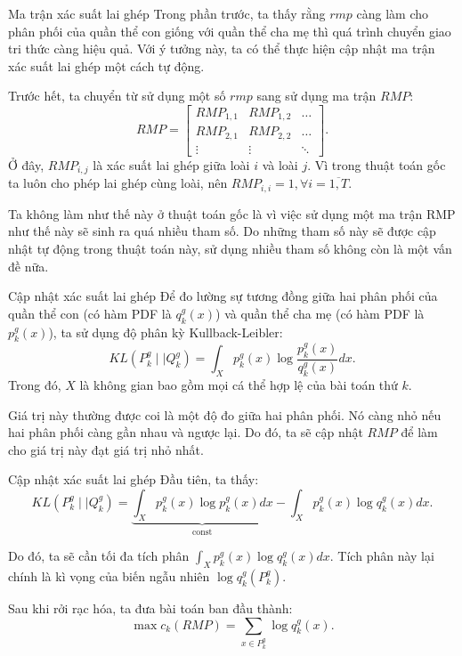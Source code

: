 \begin{frame}{Ma trận xác suất lai ghép}
Trong phần trước, ta thấy rằng \( rmp \) càng làm cho phân phối của quần thể con
giống với quần thể cha mẹ thì quá trình chuyển giao tri thức càng hiệu quả. Với
ý tưởng này, ta có thể thực hiện cập nhật ma trận xác suất lai ghép một cách tự
động.

Trước hết, ta chuyển từ sử dụng một số \( rmp \) sang sử dụng ma trận \( RMP \):
\[
  RMP = \begin{bmatrix}
    RMP_{1, 1} & RMP_{1, 2} & \ldots \\
    RMP_{2,1} & RMP_{2,2} & \ldots \\
    \vdots & \vdots & \ddots
  \end{bmatrix} 
.\]
Ở đây, \( RMP_{i,j} \) là xác suất lai ghép giữa loài \( i \) và loài \( j \).
Vì trong thuật toán gốc ta luôn cho phép lai ghép cùng loài, nên \( RMP_{i,i} =
1, \forall i=\overline{1,T}\).

Ta không làm như thế này ở thuật toán gốc là vì việc sử dụng một ma trận RMP như
thế này sẽ sinh ra quá nhiều tham số. Do những tham số này sẽ được cập nhật tự
động trong thuật toán này, sử dụng nhiều tham số không còn là một vấn đề nữa.
\end{frame}


\begin{frame}{Cập nhật xác suất lai ghép}
  Để đo lường sự tương đồng giữa hai phân phối của quần thể con (có hàm PDF là
  \( q_{k}^{g}(x) \)) và quần thể cha mẹ (có hàm PDF là \( p_{k}^{g}(x) \)), ta
  sử dụng độ phân kỳ Kullback-Leibler:
  \[
    KL(P^{g}_{k}\mid \mid Q^{g}_{k}) = \int_{X} p^{g}_{k}(x) \log
    \frac{p^{g}_{k}(x)}{q^{g}_{k}(x)} dx
  .\] 
  Trong đó, \( X \) là không gian bao gồm mọi cá thể hợp lệ của bài toán thứ \(
  k\).

  Giá trị này thường được coi là một độ đo giữa hai phân phối. Nó càng nhỏ nếu
  hai phân phối càng gần nhau và ngược lại. Do đó, ta sẽ cập nhật \( RMP \) để
  làm cho giá trị này đạt giá trị nhỏ nhất.
\end{frame}

\begin{frame}{Cập nhật xác suất lai ghép}
  Đầu tiên, ta thấy:
  \[
    KL(P^{g}_{k}\mid \mid Q^{g}_{k}) = \underbrace{\int_{X} p^{g}_{k}(x) \log
    p^{g}_{k}(x)dx}_{\text{const}} - \int_{X} p^{g}_{k}(x) \log q^{g}_{k}(x)dx
  .\] 

  Do đó, ta sẽ cần tối đa tích phân \( \int_{X} p^{g}_{k}(x) \log q^{g}_{k}(x)dx
  \). Tích phân này lại chính là kì vọng của biến ngẫu nhiên \( \log
  q^{g}_{k}(P^{g}_{k}) \).

  Sau khi rởi rạc hóa, ta đưa bài toán ban đầu thành:
  \[
    \max c_{k}(RMP) = \sum_{x \in P^{g}_{k}} \log q^{g}_{k}(x)
  .\]
\end{frame}

